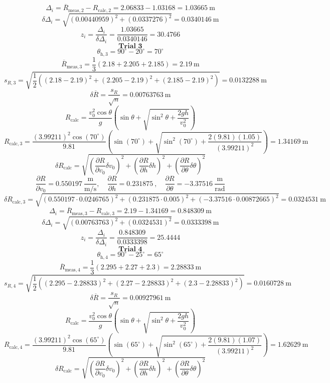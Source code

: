 \documentclass[11pt]{article}
\begin{document}
\[
\Delta_i = \overline{R}_{\mathrm{meas},2} - R_{\mathrm{calc},2} = 2.06833 - 1.03168 = 1.03665\ \mathrm{m}
\]
\[
\delta \Delta_i = \sqrt{(0.00440959)^2 + (0.0337276)^2} = 0.0340146\ \mathrm{m}
\]
\[
z_i = \frac{\Delta_i}{\delta \Delta_i} = \frac{1.03665}{0.0340146} = 30.4766
\]
\[
\textbf{Trial 3}
\]
\[
\theta_{\mathrm{h},3} = 90^\circ - 20^\circ = 70^\circ
\]
\[
\overline{R}_{\mathrm{meas},3} = \frac{1}{3}\left(2.18 + 2.205 + 2.185\right) = 2.19\ \mathrm{m}
\]
\[
s_{R,3} = \sqrt{\frac{1}{2}\left((2.18 - 2.19)^2 + (2.205 - 2.19)^2 + (2.185 - 2.19)^2\right)} = 0.0132288\ \mathrm{m}
\]
\[
\delta \overline{R} = \dfrac{s_R}{\sqrt{n}} = 0.00763763\ \mathrm{m}
\]
\[
R_{\mathrm{calc}} = \frac{v_0^2\cos\theta}{g}\left(\sin\theta + \sqrt{\sin^2\theta + \frac{2gh}{v_0^2}}\right)
\]
\[
R_{\mathrm{calc},3} = \frac{(3.99211)^2\cos(70^\circ)}{9.81}\left(\sin(70^\circ) + \sqrt{\sin^2(70^\circ) + \frac{2(9.81)(1.05)}{(3.99211)^2}}\right) = 1.34169\ \mathrm{m}
\]
\[
\delta R_{\mathrm{calc}} = \sqrt{\left(\frac{\partial R}{\partial v_0}\delta v_0\right)^2 + \left(\frac{\partial R}{\partial h}\delta h\right)^2 + \left(\frac{\partial R}{\partial \theta}\delta \theta\right)^2}
\]
\[
\frac{\partial R}{\partial v_0} = 0.550197\ \frac{\mathrm{m}}{\mathrm{m/s}},\quad \frac{\partial R}{\partial h} = 0.231875\ ,\quad \frac{\partial R}{\partial \theta} = -3.37516\ \frac{\mathrm{m}}{\mathrm{rad}}
\]
\[
\delta R_{\mathrm{calc},3} = \sqrt{(0.550197\cdot 0.0246765)^2 + (0.231875\cdot 0.005)^2 + (-3.37516\cdot 0.00872665)^2} = 0.0324531\ \mathrm{m}
\]
\[
\Delta_i = \overline{R}_{\mathrm{meas},3} - R_{\mathrm{calc},3} = 2.19 - 1.34169 = 0.848309\ \mathrm{m}
\]
\[
\delta \Delta_i = \sqrt{(0.00763763)^2 + (0.0324531)^2} = 0.0333398\ \mathrm{m}
\]
\[
z_i = \frac{\Delta_i}{\delta \Delta_i} = \frac{0.848309}{0.0333398} = 25.4444
\]
\[
\textbf{Trial 4}
\]
\[
\theta_{\mathrm{h},4} = 90^\circ - 25^\circ = 65^\circ
\]
\[
\overline{R}_{\mathrm{meas},4} = \frac{1}{3}\left(2.295 + 2.27 + 2.3\right) = 2.28833\ \mathrm{m}
\]
\[
s_{R,4} = \sqrt{\frac{1}{2}\left((2.295 - 2.28833)^2 + (2.27 - 2.28833)^2 + (2.3 - 2.28833)^2\right)} = 0.0160728\ \mathrm{m}
\]
\[
\delta \overline{R} = \dfrac{s_R}{\sqrt{n}} = 0.00927961\ \mathrm{m}
\]
\[
R_{\mathrm{calc}} = \frac{v_0^2\cos\theta}{g}\left(\sin\theta + \sqrt{\sin^2\theta + \frac{2gh}{v_0^2}}\right)
\]
\[
R_{\mathrm{calc},4} = \frac{(3.99211)^2\cos(65^\circ)}{9.81}\left(\sin(65^\circ) + \sqrt{\sin^2(65^\circ) + \frac{2(9.81)(1.07)}{(3.99211)^2}}\right) = 1.62629\ \mathrm{m}
\]
\[
\delta R_{\mathrm{calc}} = \sqrt{\left(\frac{\partial R}{\partial v_0}\delta v_0\right)^2 + \left(\frac{\partial R}{\partial h}\delta h\right)^2 + \left(\frac{\partial R}{\partial \theta}\delta \theta\right)^2}
\]
\end{document}
